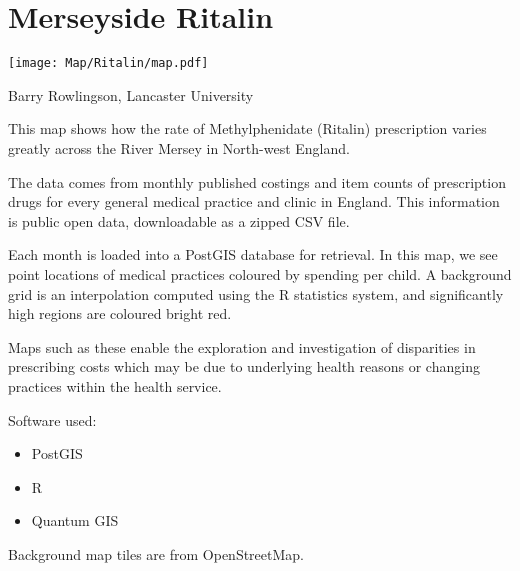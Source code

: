 

\section{Merseyside Ritalin}

\begin{marginfigure}
\texttt{[image: Map/Ritalin/map.pdf]}
\end{marginfigure}

Barry Rowlingson, Lancaster University

This map shows how the rate of Methylphenidate (Ritalin) prescription varies
greatly across the River Mersey in North-west England.

The data comes from monthly published costings and item counts of
prescription drugs for every general medical practice and clinic in 
England. This information is public open data, downloadable as a 
zipped CSV file.

Each month is loaded into a PostGIS database for retrieval. In this map,
we see point locations of medical practices coloured by spending per child.
A background grid is an interpolation computed using the R statistics system,
and significantly high regions are coloured bright red.

Maps such as these enable the exploration and investigation of disparities in
prescribing costs which may be due to underlying health reasons or changing
practices within the health service.

Software used:

\begin{itemize}
\item PostGIS 
\item R 
\item Quantum GIS 
\end{itemize}

Background map tiles are from OpenStreetMap. 


